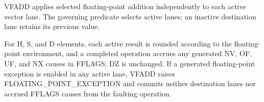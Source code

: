 VFADD applies selected floating-point addition independently to each active
vector lane. The governing predicate selects active lanes; an inactive
destination lane retains its previous value.

For H, S, and D elements, each active result is rounded according to the
floating-point environment, and a completed operation
accrues any generated NV, OF, UF, and NX causes in FFLAGS; DZ is unchanged.
If a generated floating-point exception is enabled in any active lane, VFADD
raises FLOATING\_POINT\_EXCEPTION and commits neither destination lanes nor accrued
FFLAGS causes from the faulting operation.
